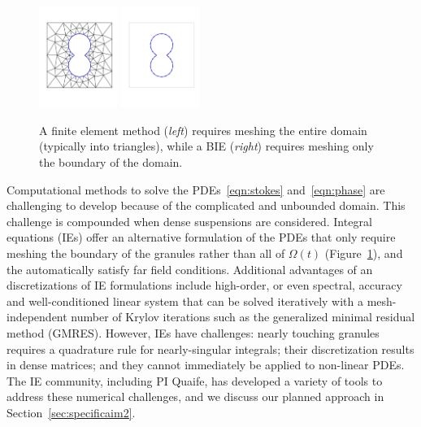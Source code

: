 \begin{figure}
  \centering
  \includegraphics[width=1in]{figures/Background/Peanut/PeanutFEM.pdf}
  \includegraphics[width=1in]{figures/Background/Peanut/PeanutIE.pdf}
  \caption{\label{fig:fem_vs_bie} \footnotesize A finite element method
  ({\em left}) requires meshing the entire domain (typically into
  triangles), while a BIE ({\em right}) requires meshing only the
  boundary of the domain.}
\end{figure}
Computational methods to solve the PDEs~\eqref{eqn:stokes}
and~\eqref{eqn:phase} are challenging to develop because of
the complicated and unbounded domain.
This challenge is compounded when dense
suspensions are considered. Integral equations (IEs) offer an
alternative formulation of the PDEs that only require meshing the
boundary of the granules rather than all of $\Omega(t)$
(Figure~\ref{fig:fem_vs_bie}), and the automatically satisfy far field
conditions. Additional advantages of an discretizations of IE
formulations include high-order, or even spectral, accuracy and
well-conditioned linear system that can be solved iteratively with a
mesh-independent number of Krylov iterations such as the generalized
minimal residual method (GMRES). However, IEs have challenges: nearly
touching granules requires a quadrature rule for nearly-singular
integrals; their discretization results in dense matrices; and they
cannot immediately be applied to non-linear PDEs. The IE community,
including PI Quaife, has developed a variety of tools to address these
numerical challenges, and we discuss our planned approach in
Section~\ref{sec:specificaim2}.

